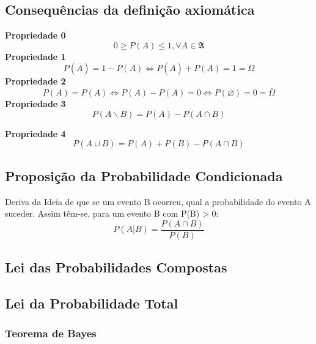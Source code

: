 \documentclass[a4paper,12pt]{article}
\let\empty\varnothing
\let\eqv\Longleftrightarrow
\begin{document}
		\subsection{Consequências da definição axiomática}
		\begin{center}
			{\bfseries Propriedade 0}
			\begin{equation}
				0 \geq P(A) \leq 1 , \forall A \in \mathfrak{A}
			\end{equation}
			{\bfseries Propriedade 1}
			\begin{equation}
				P(\overline{A})=1-P(A) \eqv P(\overline{A})+P(A)=1 = \Omega 
			\end{equation}
			{\bfseries Propriedade 2}
                          \begin{equation}
                                  P(A)=P(A) \eqv P(A)-P(A)=0 \eqv P(\empty)=0=\overline{\Omega} 
                          \end{equation}
			{\bfseries Propriedade 3}
                        \begin{equation}
                                  P(A\backslash B) = P(A)-P(A \cap B)
                        \end{equation}
			                             
                        {\bfseries Propriedade 4}
                          \begin{equation}
                                  P(A\cup B)= P(A)+P(B)-P(A\cap B)
                          \end{equation}
		\end{center}
		\subsection{Proposição da Probabilidade Condicionada}
		Deriva da Ideia de que se um evento B ocorreu, qual a probabilidade do evento A suceder.
		Assim têm-se, para um evento B com P(B) > 0:
		\begin{equation}
			P(A|B)=\frac{P(A \cap B)}{P(B)}
		\end{equation}
		\subsection{Lei das Probabilidades Compostas}
		\subsection{Lei da Probabilidade Total}
			\subsubsection{Teorema de Bayes}

			
\end{document}
